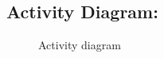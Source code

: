 \documentclass[oneside,a4paper,12pt]{book}
\begin{document}
 
\subsection{Activity Diagram:}
\begin{center}
	\begin{figure}[!htbp]
		\centering
		\caption{Activity diagram}
		\label{fig:act-dig}
	\end{figure}
\end{center} 
\end{document}
